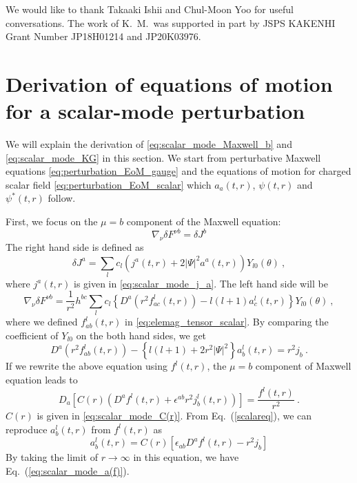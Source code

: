 \documentclass[a4paper,11pt]{article}
\begin{document}
\acknowledgments
    We would like to thank Takaaki Ishii and Chul-Moon Yoo for useful conversations.
    The work of K.~M.~was supported in part by JSPS KAKENHI Grant Number JP18H01214 and JP20K03976.




\appendix
\section{Derivation of equations of motion for a scalar-mode perturbation}
\label{appendix_scalarEOM}
    We will explain the derivation of \eqref{eq:scalar_mode_Maxwell_b} and \eqref{eq:scalar_mode_KG} in this section.
    We start from perturbative Maxwell equations \eqref{eq:perturbation_EoM_gauge} and the equations of motion for charged scalar field \eqref{eq:perturbation_EoM_scalar} which $a_a(t,r)$, $\psi(t,r)$ and $\psi^*(t,r)$ follow.

    First, we focus on the $\mu=b$ component of the Maxwell equation:
    \begin{equation}
    \label{eq:Maxwell_b}
        \nabla_\nu \delta F^{\nu b}=\delta J^b
    \end{equation}
    The right hand side is defined as
    \begin{equation}
        \delta J^a =\sum_l c_l \left(j^a(t,r) +2|\Psi|^2 a^a(t,r)\right) Y_{l0}(\theta)\ ,
    \end{equation}
    where $j^a(t,r)$ is given in \eqref{eq:scalar_mode_j_a}.
    The left hand side will be 
    \begin{equation}
        \nabla_\nu \delta F^{\nu b}=
        \frac{1}{r^2}h^{bc} \sum_l c_l \left\{
        D^a\left(r^2 f^l_{ac}(t,r)\right)-l(l+1) a^l_c(t,r)
        \right\}Y_{l0}(\theta)\ ,
    \end{equation}
    where we defined $f^l_{ab}(t,r)$ in \eqref{eq:elemag_tensor_scalar}. 
    By comparing the coefficient of $Y_{l0}$ on the both hand sides, we get
    \begin{equation}
         D^a\left(r^2f^l_{ab}(t,r)\right)-\left\{l(l+1)+2r^2|\Psi|^2\right\} a^l_b(t,r) = r^2 j_b\ .
        \label{scalareq}
    \end{equation}
    If we rewrite the above equation using $f^l(t,r)$, the $\mu=b$ component of Maxwell equation leads to
    \begin{equation}
        D_a\left[C(r)\left(D^a f^l(t,r) + \epsilon^{ab} r^2 j^l_b(t,r) \right)\right]=\frac{f^l(t,r)}{r^2}\ .
    \end{equation}
    $C(r)$ is given in \eqref{eq:scalar_mode_C(r)}. From Eq.~(\ref{scalareq}), we can reproduce $a^l_b(t,r)$ from $f^l(t,r)$ as
    \begin{equation}
    a^l_b(t,r) = C(r)[\epsilon_{ab} D^a f^l(t,r) - r^2 j_b]
    \end{equation}
    By taking the limit of $r\to \infty$ in this equation, we have Eq.~(\ref{eq:scalar_mode_a(f)}).
\end{document}
